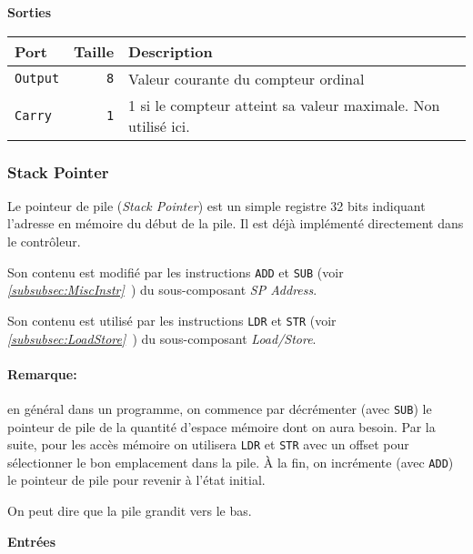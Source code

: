 \vspace{1em}
\textbf{Sorties}\\

\begin{tabular}{|l|r|l|}
\hline 
\textbf{Port} & \textbf{Taille} & \textbf{Description}\\
\hline

\hline
\texttt{Output}		&  \texttt{8} & Valeur courante du compteur ordinal\\
\hline
\texttt{Carry}		&  \texttt{1} & 1 si le compteur atteint sa valeur maximale. Non utilisé ici.\\

\hline
\end{tabular}


\subsubsection{Stack Pointer}


Le pointeur de pile (\textit{Stack Pointer}) est un simple registre 32 bits indiquant l'adresse en mémoire du début de la pile.
Il est déjà implémenté directement dans le contrôleur.

Son contenu est modifié par les instructions \texttt{ADD} et \texttt{SUB} 
(voir \textit{\ref{subsubsec:MiscInstr}~}) du sous-composant \textit{SP Address}.

Son contenu est utilisé par les instructions \texttt{LDR} et \texttt{STR} 
(voir \textit{\ref{subsubsec:LoadStore}~}) du sous-composant \textit{Load/Store}.

\paragraph{Remarque:} en général dans un programme, on commence par décrémenter (avec \texttt{SUB}) le pointeur de pile de la quantité d'espace mémoire dont on aura besoin. Par la suite, pour les accès mémoire on utilisera \texttt{LDR} et \texttt{STR} avec un offset pour sélectionner le bon emplacement dans la pile. À la fin, on incrémente (avec \texttt{ADD}) le pointeur de pile pour revenir à l'état initial.

On peut dire que la pile grandit vers le bas.


\textbf{Entrées}\\

